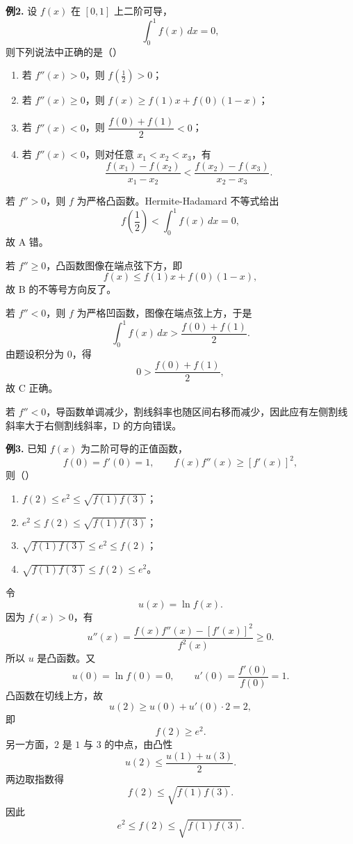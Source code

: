 \begin{problemblock}
\textbf{例2.} 设 \(f(x)\) 在 \([0,1]\) 上二阶可导，
\[
\int_0^1 f(x)\,dx=0,
\]
则下列说法中正确的是（\quad）
\begin{enumerate}[label=\Alph*., leftmargin=2.2em]
\item 若 \(f''(x)>0\)，则 \(f\left(\frac12\right)>0\)；
\item 若 \(f''(x)\ge0\)，则 \(f(x)\ge f(1)x+f(0)(1-x)\)；
\item 若 \(f''(x)<0\)，则 \(\dfrac{f(0)+f(1)}2<0\)；
\item 若 \(f''(x)<0\)，则对任意 \(x_1<x_2<x_3\)，有
\[
\frac{f(x_1)-f(x_2)}{x_1-x_2}
<
\frac{f(x_2)-f(x_3)}{x_2-x_3}.
\]
\end{enumerate}
\end{problemblock}
\begin{solutionblock}
若 \(f''>0\)，则 \(f\) 为严格凸函数。Hermite-Hadamard 不等式给出
\[
f\left(\frac12\right)<\int_0^1 f(x)\,dx=0,
\]
故 A 错。

若 \(f''\ge0\)，凸函数图像在端点弦下方，即
\[
f(x)\le f(1)x+f(0)(1-x),
\]
故 B 的不等号方向反了。

若 \(f''<0\)，则 \(f\) 为严格凹函数，图像在端点弦上方，于是
\[
\int_0^1 f(x)\,dx>\frac{f(0)+f(1)}2.
\]
由题设积分为 \(0\)，得
\[
0>\frac{f(0)+f(1)}2,
\]
故 C 正确。

若 \(f''<0\)，导函数单调减少，割线斜率也随区间右移而减少，因此应有左侧割线斜率大于右侧割线斜率，D 的方向错误。
\end{solutionblock}

\begin{problemblock}
\textbf{例3.} 已知 \(f(x)\) 为二阶可导的正值函数，
\[
f(0)=f'(0)=1,\qquad f(x)f''(x)\ge [f'(x)]^2,
\]
则（\quad）
\begin{enumerate}[label=\Alph*., leftmargin=2.2em]
\item \(f(2)\le e^2\le\sqrt{f(1)f(3)}\)；
\item \(e^2\le f(2)\le\sqrt{f(1)f(3)}\)；
\item \(\sqrt{f(1)f(3)}\le e^2\le f(2)\)；
\item \(\sqrt{f(1)f(3)}\le f(2)\le e^2\)。
\end{enumerate}
\end{problemblock}
\begin{solutionblock}
令
\[
u(x)=\ln f(x).
\]
因为 \(f(x)>0\)，有
\[
u''(x)=\frac{f(x)f''(x)-[f'(x)]^2}{f^2(x)}\ge0.
\]
所以 \(u\) 是凸函数。又
\[
u(0)=\ln f(0)=0,\qquad
u'(0)=\frac{f'(0)}{f(0)}=1.
\]
凸函数在切线上方，故
\[
u(2)\ge u(0)+u'(0)\cdot2=2,
\]
即
\[
f(2)\ge e^2.
\]
另一方面，\(2\) 是 \(1\) 与 \(3\) 的中点，由凸性
\[
u(2)\le\frac{u(1)+u(3)}2.
\]
两边取指数得
\[
f(2)\le\sqrt{f(1)f(3)}.
\]
因此
\[
e^2\le f(2)\le\sqrt{f(1)f(3)}.
\]
\end{solutionblock}

